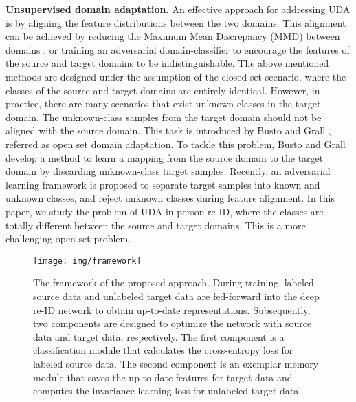\documentclass[10pt,twocolumn,letterpaper]{article}
\begin{document}
\textbf{Unsupervised domain adaptation.} 
An effective approach for addressing UDA is by aligning the feature distributions between the two domains. This alignment can be achieved by reducing the Maximum Mean Discrepancy (MMD) \cite{gretton2007kernel} between domains \cite{long2015learning,yan2017mind}, or training an adversarial domain-classifier \cite{bousmalis2016domain,tzeng2017adversarial} to encourage the features of the source and target domains to be indistinguishable. 
The above mentioned methods are designed under the assumption of the closed-set scenario, where the classes of the source and target domains are entirely identical. 
However, in practice, there are many scenarios that exist unknown classes in the target domain. The unknown-class samples from the target domain should not be aligned with the source domain. 
This task is introduced by Busto and Grall \cite{busto2017open-set}, referred as open set domain adaptation. To tackle this problem, Busto and Grall \cite{busto2017open-set} develop a method to learn a mapping from the source domain to the target domain by discarding unknown-class target samples. Recently, an adversarial learning framework \cite{saito2018open} is proposed to separate target samples into known and unknown classes, and reject unknown classes during feature alignment. In this paper, we study the problem of UDA in person re-ID, where the classes are totally different between the source and target domains. This is a more challenging open set problem.


\begin{figure*}[!t]
    \centering
    \texttt{[image: img/framework]}
    \caption{The framework of the proposed approach. During training, labeled source data and unlabeled target data are fed-forward into the deep re-ID network to obtain up-to-date representations. Subsequently, two components are designed to optimize the network with source data and target data, respectively. The first component is a classification module that calculates the cross-entropy loss for labeled source data. The second component is an exemplar memory module that saves the up-to-date features for target data and computes the invariance learning loss for unlabeled target data.}
    \label{fig:framework}
    \vspace{-.07in}
\end{figure*}
\end{document}
